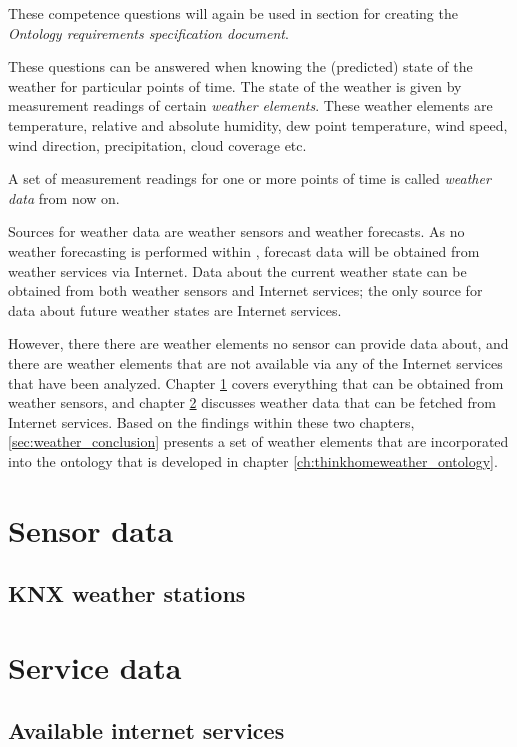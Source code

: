 These competence questions will again be used in section \label{sec:ontology_specification} for creating the \emph{Ontology requirements specification document}.

These questions can be answered when knowing the (predicted) state of the weather for particular points of time. The state of the weather is given by measurement readings of certain \emph{weather elements}. These weather elements are temperature, relative and absolute humidity, dew point temperature, wind speed, wind direction, precipitation, cloud coverage etc.

A set of measurement readings for one or more points of time is called \emph{weather data} from now on.

Sources for weather data are weather sensors and weather forecasts. As no weather forecasting is performed within \thinkhome, forecast data will be obtained from weather services via Internet. Data about the current weather state can be obtained from both weather sensors and Internet services; the only source for data about future weather states are Internet services.

However, there there are weather elements no sensor can provide data about, and there are weather elements that are not available via any of the Internet services that have been analyzed. Chapter \ref{sec:weather_sensors} covers everything that can be obtained from weather sensors, and chapter \ref{sec:weather_services} discusses weather data that can be fetched from Internet services. Based on the findings within these two chapters, \ref{sec:weather_conclusion} presents a set of weather elements that are incorporated into the ontology that is developed in chapter \ref{ch:thinkhomeweather_ontology}.

\section{Sensor data}
\label{sec:weather_sensors}

\subsection{KNX weather stations}

\section{Service data}
\label{sec:weather_services}

\subsection{Available internet services}

